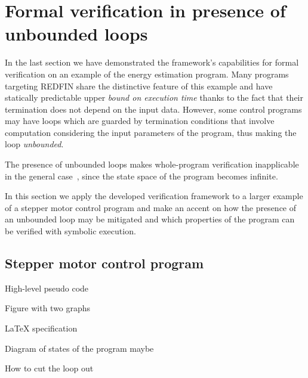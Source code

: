 \section{Formal verification in presence of unbounded loops\label{sec-motor-control}}

In the last section we have demonstrated the framework's capabilities for
formal verification on an example of the energy estimation program.
Many programs targeting REDFIN share the distinctive feature of
this example and have statically predictable upper \emph{bound on execution time}
thanks to the fact that their termination does not
depend on the input data. However, some control programs may have loops
which are guarded by termination conditions that involve computation
considering the input parameters of the program, thus making the loop
\emph{unbounded}.


The presence of unbounded loops makes whole-program
verification inapplicable in the general case~\cite{some-paper-on-symexec},
since the state space of the program becomes infinite.

In this section we apply the developed verification framework to a larger
example of a stepper motor control program and make an accent on how
the presence of an unbounded loop may be mitigated and which properties
of the program can be verified with symbolic execution.

\subsection{Stepper motor control program}

High-level pseudo code

Figure with two graphs

LaTeX specification

Diagram of states of the program maybe

How to cut the loop out